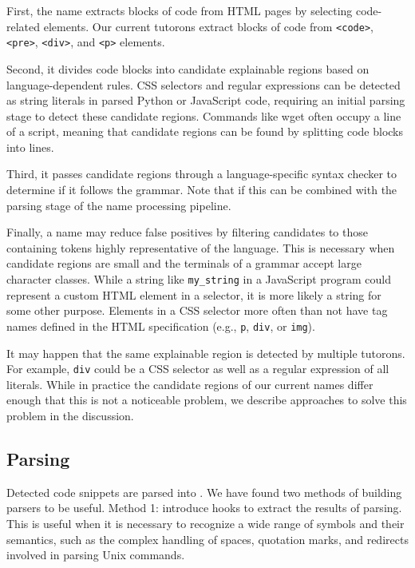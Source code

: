 {First, the \Gls{name} extracts blocks of code from HTML pages by selecting code-related elements.
Our current tutorons extract blocks of code from \texttt{<code>}, \texttt{<pre>}, \texttt{<div>}, and \texttt{<p>} elements. 

Second, it divides code blocks into candidate explainable regions based on language-dependent rules.
CSS selectors and regular expressions can be detected as string literals in parsed Python or JavaScript code, requiring an initial parsing stage to detect these candidate regions.
Commands like wget often occupy a line of a script, meaning that candidate regions can be found by splitting code blocks into lines.

Third, it passes candidate regions through a language-specific syntax checker to determine if it follows the grammar.
Note that if this can be combined with the parsing stage of the \Gls{name} processing pipeline. 

Finally, a \Gls{name} may reduce false positives by filtering candidates to those containing tokens highly representative of the language.
This is necessary when candidate regions are small and the terminals of a grammar accept large character classes.
While a string like \texttt{\qs{}my\_string\qs{}} in a JavaScript program could represent a custom HTML element in a selector, it is more likely a string for some other purpose.
Elements in a CSS selector more often than not have tag names defined in the HTML specification (e.g., \texttt{p}, \texttt{div}, or \texttt{img}).

\begin{changes}
It may happen that the same explainable region is detected by multiple tutorons. 
For example, \texttt{div} could be a CSS selector as well as a regular expression of all literals.
While in practice the candidate regions of our current \Glspl{name} differ enough that this is not a noticeable problem, we describe approaches to solve this problem in the discussion.
\end{changes}

\subsection{Parsing}
Detected code snippets are parsed into .
We have found two methods of building parsers to be useful. Method 1: introduce hooks to extract the results of parsing.  This is useful 
when it is necessary to recognize a wide range of symbols and their semantics, %
such as the complex handling of spaces, quotation marks, and redirects involved in parsing Unix commands.

}
